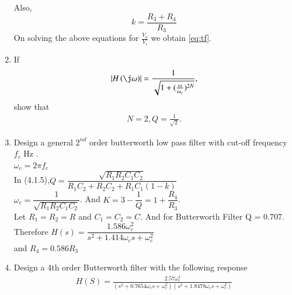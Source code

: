 \documentclass[journal,12pt,twocolumn]{IEEEtran}
\renewcommand\thesection{\arabic{section}}
\begin{document}
\begin{enumerate}[label=\thesection.\arabic*,ref=\thesection.\theenumi]
Also,
\begin{equation}
k = \dfrac{R_{3}+R_{4}}{R_{3}}
\end{equation}
On solving the above equations for $\frac{V_o}{V_i}$  we obtain \eqref{eq:tf}. 
\item If 
\begin{equation}
\abs{H\brak{\j\omega}}= \frac{1}{\sqrt{1+{(\frac{\omega}{\omega _c}) ^{2N}}}},
\end{equation}
%
show that
\begin{align}
N = 2, Q = \frac{1}{\sqrt{2}}.
\end{align}

\item Design a general $2^{nd}$ order butterworth low pass filter with cut-off frequency $f_{c}$ Hz  .\\
\solution $\omega_{c} = 2\pi f_{c}$\\
In (4.1.5),$Q = \dfrac{\sqrt{R_{1}R_{2}C_{1}C_{2}}}{R_{1}C_{2}+R_{2}C_{2}+R_{1}C_{1}(1-k)}$\\
$\omega_{c} = \dfrac{1}{\sqrt{R_{1}R_{2}C_{1}C_{2}}}$. And $K = 3-\dfrac{1}{Q}=1+\dfrac{R_{4}}{R_{3}}$.\\Let $R_{1}=R_{2}=R$ and $C_{1}=C_{2}=C$. And for Butterworth Filter Q = 0.707.\\
Therefore $H(s) = \dfrac{1.586\omega_{c}^{2}}{s^{2}+ 1.414\omega_{c}s+\omega_{c}^{2}}$\\
and $R_{4} = 0.586R_{3}$
\item Design a 4th order Butterworth filter with the following response
\begin{align}
H(S) = \frac{2.57\omega_{c}^{4}}{(s^{2} + 0.7654\omega_{c}s + \omega_{c}^{2})(s^{2} + 1.8478\omega_{c}s + \omega_{c}^{2})}
\end{align}

\end{enumerate}
\end{document}
